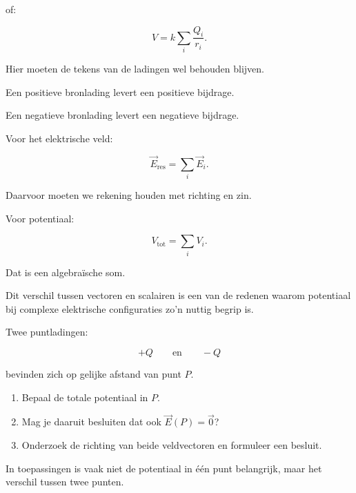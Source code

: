 \documentclass{ximera}
\begin{document}
of:

\[
\boxed{
V
=
k\sum_i\frac{Q_i}{r_i}.
}
\]


Hier moeten de tekens van de ladingen wel behouden blijven.

Een positieve bronlading levert een positieve bijdrage.

Een negatieve bronlading levert een negatieve bijdrage.




Voor het elektrische veld:

\[
\boxed{
\vec E_\mathrm{res}
=
\sum_i\vec E_i.
}
\]

Daarvoor moeten we rekening houden met richting en zin.

Voor potentiaal:

\[
\boxed{
V_\mathrm{tot}
=
\sum_iV_i.
}
\]

Dat is een algebraïsche som.

Dit verschil tussen vectoren en scalairen is een van de redenen waarom
potentiaal bij complexe elektrische configuraties zo'n nuttig begrip
is.


\begin{oefening}{\oefU\ESS}

Twee puntladingen:

\[
+Q
\qquad\text{en}\qquad
-Q
\]

bevinden zich op gelijke afstand van punt $P$.

\begin{enumerate}
  \item Bepaal de totale potentiaal in $P$.
  \item Mag je daaruit besluiten dat ook
        $\vec E(P)=\vec 0$?
  \item Onderzoek de richting van beide veldvectoren en formuleer een
        besluit.
\end{enumerate}

\end{oefening}




In toepassingen is vaak niet de potentiaal in één punt belangrijk,
maar het verschil tussen twee punten.
\end{document}
